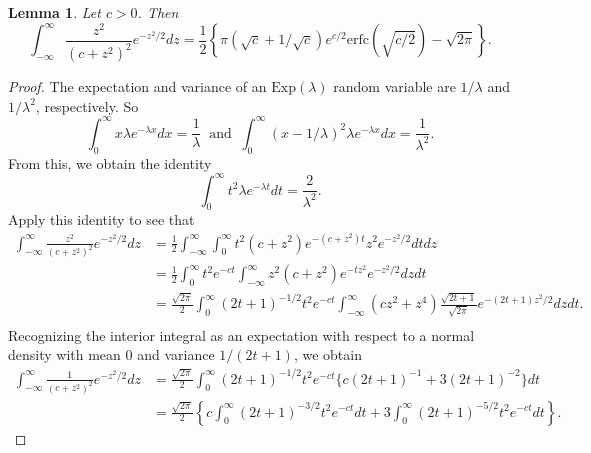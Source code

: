 \documentclass[12pt]{article}
\newtheorem{lemma}{Lemma}
\begin{document}
\begin{lemma}\label{lem:intid2}
Let $c > 0$. Then
\begin{equation*}
\int_{-\infty}^\infty \frac{z^2}{(c + z^2)^{2}}e^{-z^2/2} dz = \frac{1}{2}\left\{\pi(\sqrt{c} + 1/\sqrt{c}) e^{c/2} \mathrm{erfc}(\sqrt{c/2}) -\sqrt{2\pi} \right\}.
\end{equation*}
\end{lemma}
\begin{proof}
The expectation and variance of an $\mathrm{Exp}(\lambda)$ random variable are $1/\lambda$ and $1/\lambda^2$, respectively. So
\begin{equation*}
    \int_{0}^\infty x \lambda e^{-\lambda x} dx = \frac{1}{\lambda}~\text{ and }~\int_{0}^\infty (x-1/\lambda)^2 \lambda e^{-\lambda x} dx = \frac{1}{\lambda^2}.
\end{equation*}
From this, we obtain the identity
\begin{equation*}
    \int_{0}^\infty t^2 \lambda e^{-\lambda t} dt = \frac{2}{\lambda^2} .
\end{equation*}
Apply this identity to see that 
\begin{equation*}
    \begin{aligned}
        \int_{-\infty}^\infty \frac{z^2}{(c + z^2)^{2}}e^{-z^2/2} dz &= \frac{1}{2} \int_{-\infty}^\infty \int_0^\infty t^2 (c+z^2)e^{-(c+z^2)t} z^2 e^{-z^2/2} dt dz \\ 
        &= \frac{1}{2} \int_0^\infty t^2 e^{-ct} \int_{-\infty}^\infty z^2(c+z^2)e^{-t z^2} e^{-z^2/2} dz dt \\
        &= \frac{\sqrt{2\pi}}{2} \int_0^\infty (2t+1)^{-1/2}t^2 e^{-ct} \int_{-\infty}^\infty (cz^2+z^4)\frac{\sqrt{2t+1}}{\sqrt{2\pi}} e^{-(2t+1)z^2/2} dz dt .\\
    \end{aligned}
\end{equation*}
Recognizing the interior integral as an expectation with respect to a normal density with mean $0$ and variance $1/(2t+1)$, we obtain
\begin{equation*}
    \begin{aligned}
        \int_{-\infty}^\infty \frac{1}{(c + z^2)^{2}}e^{-z^2/2} dz &= \frac{\sqrt{2\pi}}{2} \int_0^\infty (2t+1)^{-1/2}t^2 e^{-ct} \{c(2t+1)^{-1} + 3(2t+1)^{-2}\} dt \\
        &= \frac{\sqrt{2\pi}}{2} \left\{ c\int_0^\infty (2t+1)^{-3/2}t^2 e^{-ct} dt + 3\int_0^\infty (2t+1)^{-5/2}t^2 e^{-ct} dt\right\}.
    \end{aligned}
\end{equation*}

\end{proof}
\end{document}
